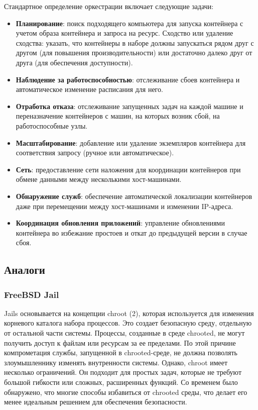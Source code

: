 Стандартное определение оркестрации включает следующие задачи:
\begin{itemize}
\item \textbf{Планирование}: поиск подходящего компьютера для запуска контейнера с учетом образа контейнера и запроса на ресурс. Сходство или удаление сходства: указать, что контейнеры в наборе должны запускаться рядом друг с другом (для повышения производительности) или достаточно далеко друг от друга (для обеспечения доступности).
\item \textbf{Наблюдение за работоспособностью}: отслеживание сбоев контейнера и автоматическое изменение расписания для него.
\item \textbf{Отработка отказа}: отслеживание запущенных задач на каждой машине и переназначение контейнеров с машин, на которых возник сбой, на работоспособные узлы.
\item \textbf{Масштабирование}: добавление или удаление экземпляров контейнера для соответствия запросу (ручное или автоматическое).
\item \textbf{Сеть}: предоставление сети наложения для координации контейнеров при обмене данными между несколькими хост-машинами.
\item \textbf{Обнаружение служб}: обеспечение автоматической локализации контейнеров даже при перемещении между хост-машинами и изменении IP-адреса.
\item \textbf{Координация обновления приложений}: управление обновлениями контейнера во избежание простоев и откат до предыдущей версии в случае сбоя.
\end{itemize}



\subsection{Аналоги}
\subsubsection{FreeBSD Jail}
Jails основывается на концепции chroot (2), которая используется для изменения корневого каталога набора процессов. Это создает безопасную среду, отдельную от остальной части системы. Процессы, созданные в среде chrooted, не могут получить доступ к файлам или ресурсам за ее пределами. По этой причине компрометация службы, запущенной в chrooted-среде, не должна позволять злоумышленнику изменять внутренности системы. Однако, chroot имеет несколько ограничений. Он подходит для простых задач, которые не требуют большой гибкости или сложных, расширенных функций. Со временем было обнаружено, что многие способы избавиться от chrooted среды, что делает его менее идеальным решением для обеспечения безопасности.

